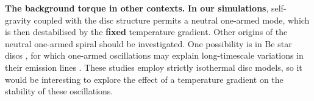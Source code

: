 {\bf The background torque in other contexts.}  
{\bf In our simulations}, self-gravity coupled with the disc 
structure permits a neutral one-armed mode, which is then
destabilised by the {\bf fixed} temperature gradient.  
Other origins of the neutral one-armed spiral should be
investigated. One possibility is in Be star discs \citep{rivinius13},
for which one-armed oscillations may explain long-timescale variations
in their emission lines \citep[see e.g.][and references 
therein]{okasaki97,papaloizou06c,ogilvie08}. These studies employ
strictly isothermal disc models, so it would be interesting to explore
the effect of a temperature gradient on the stability of these
oscillations. 

